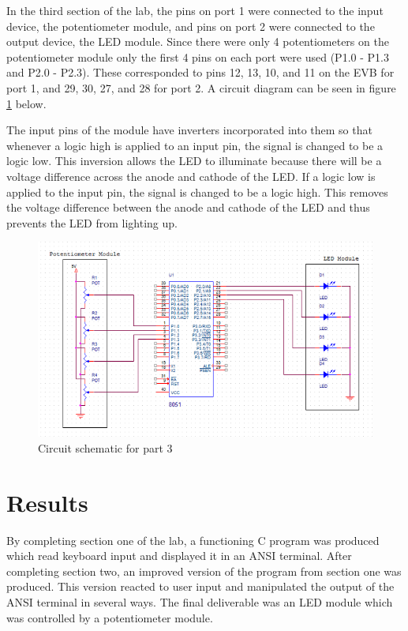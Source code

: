 \documentclass[12pt]{article}
\begin{document}
In the third section of the lab, the pins on port 1 were connected to the input device, the potentiometer module, and pins on port 2 were connected to the output device, the LED module. Since there were only 4 potentiometers on the potentiometer module only the first 4 pins on each port were used (P1.0 - P1.3 and P2.0 - P2.3). These corresponded to pins 12, 13, 10, and 11 on the EVB for port 1, and 29, 30, 27, and 28 for port 2. A circuit diagram can be seen in figure \ref{schematic} below.

The input pins of the module have inverters incorporated into them so that whenever a logic high is applied to an input pin, the signal is changed to be a logic low. This inversion allows the LED to illuminate because there will be a voltage difference across the anode and cathode of the LED. If a logic low is applied to the input pin, the signal is changed to be a logic high. This removes the voltage difference between the anode and cathode of the LED and thus prevents the LED from lighting up. 

\begin{figure}[h]
	\includegraphics{schematic.png}
	\caption{Circuit schematic for part 3}
	\label{schematic}
\end{figure} 
 
\section{Results}

By completing section one of the lab, a functioning C program was produced which read keyboard input and displayed it in an ANSI terminal. After completing section two, an improved version of the program from section one was produced. This version reacted to user input and manipulated the output of the ANSI terminal in several ways. The final deliverable was an LED module which was controlled by a potentiometer module. 
\end{document}
